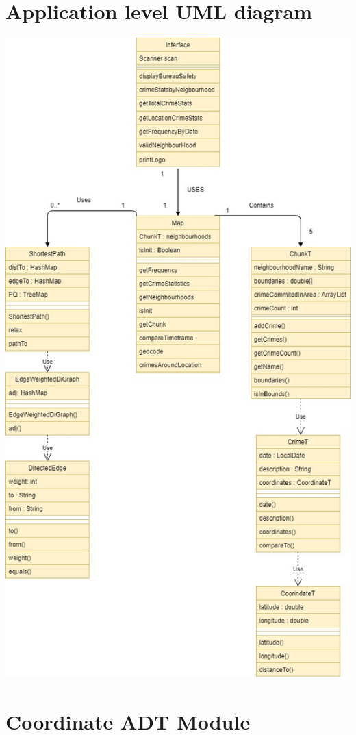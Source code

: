 \documentclass[12pt]{article}
\begin{document}
\section* {Application level UML diagram}

\includegraphics[scale = 0.5]{UML.jpg}

\section* {Coordinate ADT Module}
\end{document}
